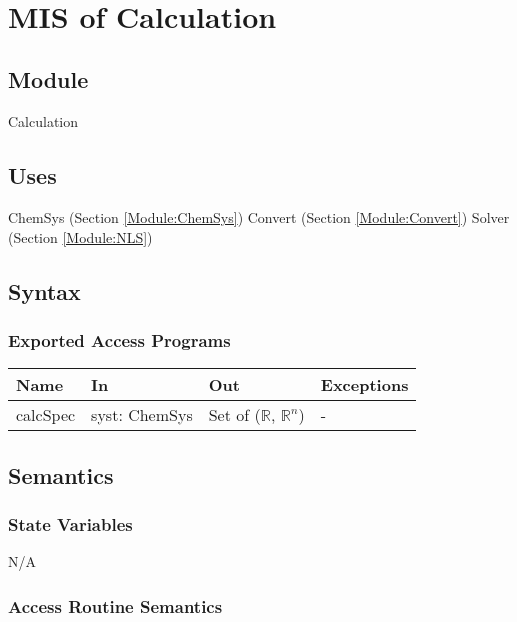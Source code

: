 \documentclass[12pt, titlepage]{article}
\begin{document}
~\newpage


\section{MIS of Calculation} \label{Module:Calculation} 

\subsection{Module}

Calculation

\subsection{Uses}

ChemSys (Section \ref{Module:ChemSys})
\newline Convert (Section \ref{Module:Convert})
\newline Solver (Section \ref{Module:NLS})

\subsection{Syntax}

\subsubsection{Exported Access Programs}

\begin{center}
\begin{tabular}{p{2cm} p{3cm} p{4.5cm} p{2.5cm}}
\hline
\textbf{Name} & \textbf{In} & \textbf{Out} & \textbf{Exceptions} \\
\hline
calcSpec & syst: ChemSys & Set of ($\mathbb{R}$, $\mathbb{R}^{n}$) & - \\
\hline
\end{tabular}
\end{center}

\subsection{Semantics}

\subsubsection{State Variables}
N/A


\subsubsection{Access Routine Semantics}
\end{document}
